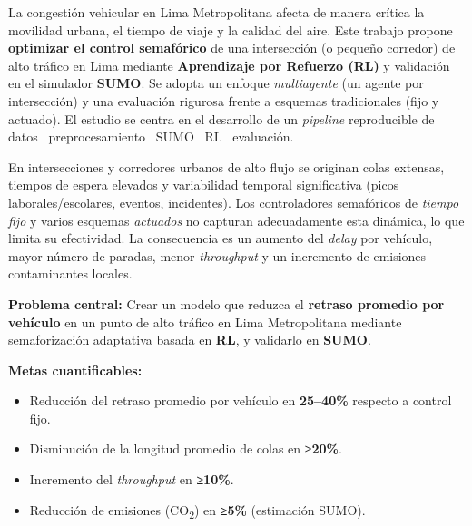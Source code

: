 

La congestión vehicular en Lima Metropolitana afecta de manera crítica la movilidad urbana, el tiempo de viaje y la calidad del aire. Este trabajo propone \textbf{optimizar el control semafórico} de una intersección (o pequeño corredor) de alto tráfico en Lima mediante \textbf{Aprendizaje por Refuerzo (RL)} y validación en el simulador \textbf{SUMO}. Se adopta un enfoque \textit{multiagente} (un agente por intersección) y una evaluación rigurosa frente a esquemas tradicionales (fijo y actuado). El estudio se centra en el desarrollo de un \textit{pipeline} reproducible de datos \textrightarrow\ preprocesamiento \textrightarrow\ SUMO \textrightarrow\ RL \textrightarrow\ evaluación. 


En intersecciones y corredores urbanos de alto flujo se originan colas extensas, tiempos de espera elevados y variabilidad temporal significativa (picos laborales/escolares, eventos, incidentes). Los controladores semafóricos de \textit{tiempo fijo} y varios esquemas \textit{actuados} no capturan adecuadamente esta dinámica, lo que limita su efectividad. La consecuencia es un aumento del \textit{delay} por vehículo, mayor número de paradas, menor \textit{throughput} y un incremento de emisiones contaminantes locales.


\textbf{Problema central:} Crear un modelo que reduzca el \textbf{retraso promedio por vehículo} en un punto de alto tráfico en Lima Metropolitana mediante semaforización adaptativa basada en \textbf{RL}, y validarlo en \textbf{SUMO}.

\textbf{Metas cuantificables:}
\begin{itemize}
    \item Reducción del retraso promedio por vehículo en \textbf{25–40\%} respecto a control fijo.
    \item Disminución de la longitud promedio de colas en \textbf{≥20\%}.
    \item Incremento del \textit{throughput} en \textbf{≥10\%}.
    \item Reducción de emisiones (CO\textsubscript{2}) en \textbf{≥5\%} (estimación SUMO).
\end{itemize}


